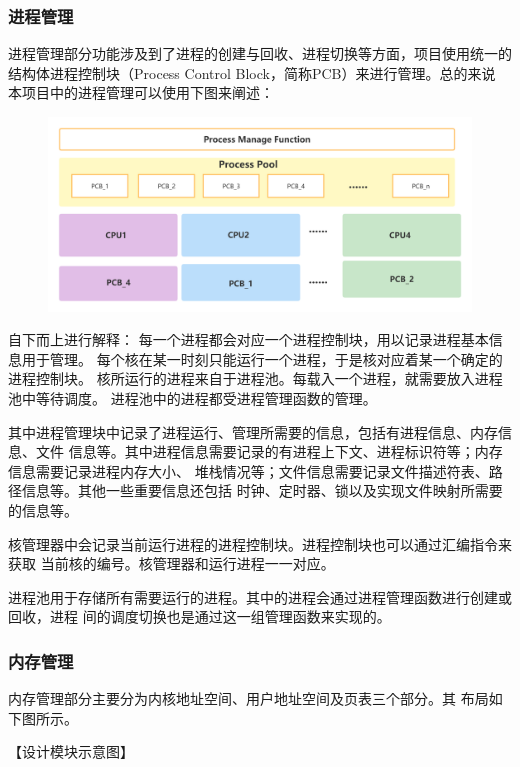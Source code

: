 \documentclass[UTF8,a4paper,10pt]{ctexart}
\begin{document}
\subsubsection{进程管理}

进程管理部分功能涉及到了进程的创建与回收、进程切换等方面，项目使用统一的
结构体进程控制块（Process Control Block，简称PCB）来进行管理。总的来说
本项目中的进程管理可以使用下图来阐述：

\begin{figure}[H]
  \centering
  \includegraphics[scale=0.15]{image/design_proc.png}
\end{figure}

自下而上进行解释：
每一个进程都会对应一个进程控制块，用以记录进程基本信息用于管理。
每个核在某一时刻只能运行一个进程，于是核对应着某一个确定的进程控制块。
核所运行的进程来自于进程池。每载入一个进程，就需要放入进程池中等待调度。
进程池中的进程都受进程管理函数的管理。

其中进程管理块中记录了进程运行、管理所需要的信息，包括有进程信息、内存信息、文件
信息等。其中进程信息需要记录的有进程上下文、进程标识符等；内存信息需要记录进程内存大小、
堆栈情况等；文件信息需要记录文件描述符表、路径信息等。其他一些重要信息还包括
时钟、定时器、锁以及实现文件映射所需要的信息等。

核管理器中会记录当前运行进程的进程控制块。进程控制块也可以通过汇编指令来获取
当前核的编号。核管理器和运行进程一一对应。

进程池用于存储所有需要运行的进程。其中的进程会通过进程管理函数进行创建或回收，进程
间的调度切换也是通过这一组管理函数来实现的。

\subsubsection{内存管理}

内存管理部分主要分为内核地址空间、用户地址空间及页表三个部分。其
布局如下图所示。

【设计模块示意图】
\end{document}

